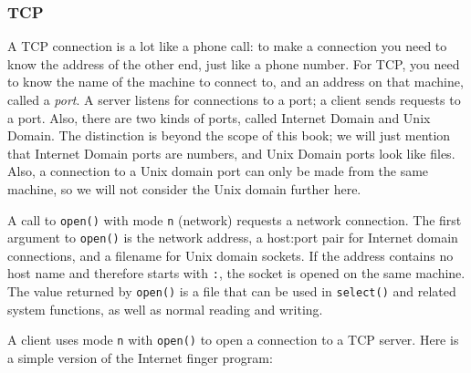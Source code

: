 \subsubsection{TCP}

A TCP connection is a lot like a phone call: to make a connection you
need to know the address of the other end, just like a phone number.
For TCP, you need to know the name of the machine to connect to, and an
address on that machine, called a \textit{port}. A server listens for
connections to a port; a client sends requests to a port. Also, there
are two kinds of ports, called {\textquotedbl}Internet
Domain{\textquotedbl} and {\textquotedbl}Unix Domain.{\textquotedbl}
The distinction is beyond the scope of this book; we will just mention
that Internet Domain ports are numbers, and Unix Domain ports look like
files. Also, a connection to a Unix domain port can only be made from
the same machine, so we will not consider the Unix domain further here.

A call to \texttt{open()} with mode
\texttt{{\textquotedbl}n{\textquotedbl}} (network) requests a network
connection. The first argument to \texttt{open()} is the network
address, a host:port pair for Internet domain connections, and a
filename for Unix domain sockets. If the address contains no host name
and therefore starts with \texttt{{\textquotedbl}:{\textquotedbl}}, the
socket is opened on the same machine. The value returned by
\texttt{open()} is a file that can be used in \texttt{select()} and
related system functions, as well as normal reading and writing. 

A client uses mode
\texttt{{\textquotedbl}n{\textquotedbl}} with \texttt{open()} to open a
connection to a TCP server. Here is a simple version of the Internet
{\textquotedbl}finger{\textquotedbl} program:

